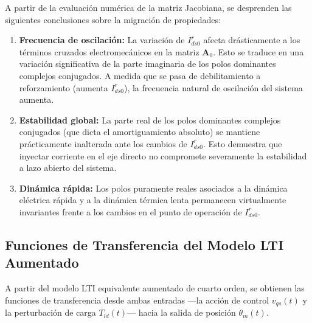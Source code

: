 \documentclass[12pt, a4paper,journal, onecolumn, compsoc]{IEEEtran}
\begin{document}
A partir de la evaluación numérica de la matriz Jacobiana, se desprenden las siguientes conclusiones sobre la migración de propiedades:
\begin{enumerate}
    \item \textbf{Frecuencia de oscilación:} La variación de $I_{ds0}^r$ afecta drásticamente a los términos cruzados electromecánicos en la matriz $\mathbf{A}_0$. Esto se traduce en una variación significativa de la parte imaginaria de los polos dominantes complejos conjugados. A medida que se pasa de debilitamiento a reforzamiento (aumenta $I_{ds0}^r$), la frecuencia natural de oscilación del sistema aumenta.
    \item \textbf{Estabilidad global:} La parte real de los polos dominantes complejos conjugados (que dicta el amortiguamiento absoluto) se mantiene prácticamente inalterada ante los cambios de $I_{ds0}^r$. Esto demuestra que inyectar corriente en el eje directo no compromete severamente la estabilidad a lazo abierto del sistema.
    \item \textbf{Dinámica rápida:} Los polos puramente reales asociados a la dinámica eléctrica rápida y a la dinámica térmica lenta permanecen virtualmente invariantes frente a los cambios en el punto de operación de $I_{ds0}^r$.
\end{enumerate}

\subsection{Funciones de Transferencia del Modelo LTI Aumentado}
A partir del modelo LTI equivalente aumentado de cuarto orden, se obtienen las funciones de transferencia desde ambas entradas ---la acción de control $v_{qs}(t)$ y la perturbación de carga $T_{ld}(t)$--- hacia la salida de posición $\theta_m(t)$.
\end{document}

